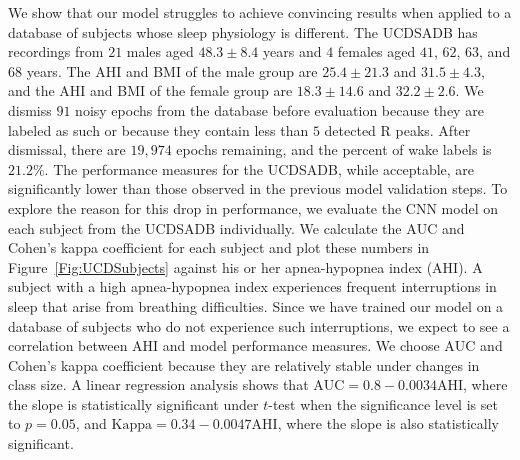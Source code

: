 \documentclass[10pt,a4paper,english]{amsart}
\begin{document}
We show that our model struggles to achieve convincing results when applied to a database of subjects whose sleep physiology is different. The UCDSADB has recordings from $21$ males aged $48.3 \pm 8.4$ years and $4$ females aged $41$, $62$, $63$, and $68$ years. 
%
The AHI and BMI of the male group are $25.4 \pm 21.3$ and $31.5 \pm 4.3$, and the AHI and BMI of the female group are $18.3 \pm 14.6$ and $32.2 \pm 2.6$.  
%
We dismiss $91$ noisy epochs from the database before evaluation because they are labeled as such or because they contain less than $5$ detected R peaks.  After dismissal, there are $19,974$ epochs remaining, and the percent of wake labels is $21.2 \%$.  The performance measures for the UCDSADB, while acceptable, are significantly lower than those observed in the previous model validation steps. To explore the reason for this drop in performance, we evaluate the CNN model on each subject from the UCDSADB individually.  We calculate the $\mathrm{AUC}$ and Cohen's kappa coefficient for each subject and plot these numbers in Figure~\ref{Fig:UCDSubjects} against his or her apnea-hypopnea index (AHI). A subject with a high apnea-hypopnea index experiences frequent interruptions in sleep that arise from breathing difficulties. Since we have trained our model on a database of subjects who do not experience such interruptions, we expect to see a correlation between AHI and model performance measures. We choose $\mathrm{AUC}$ and Cohen's kappa coefficient because they are relatively stable under changes in class size. A linear regression analysis shows that $\mathrm{AUC}=0.8-0.0034\mathrm{AHI}$, where the slope is statistically significant under $t$-test when the significance level is set to $p=0.05$, and $\mathrm{Kappa}=0.34-0.0047\mathrm{AHI}$, where the slope is also statistically significant.
\end{document}
